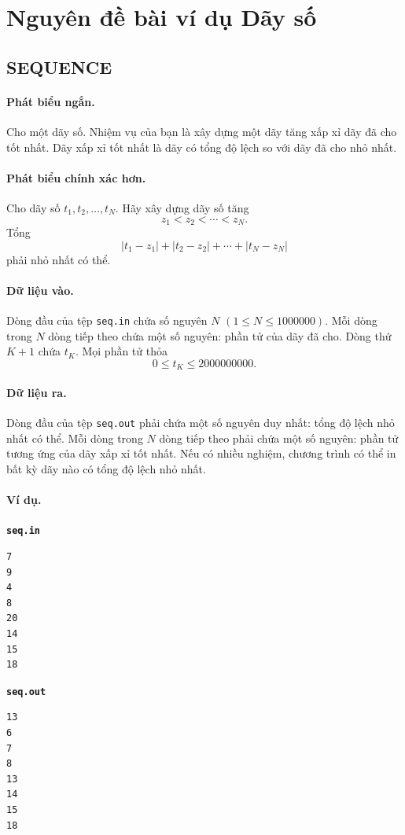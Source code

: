 \documentclass[11pt]{article}
\begin{document}
\appendix
\section{Nguyên đề bài ví dụ Dãy số}

\subsection*{SEQUENCE}

\paragraph{Phát biểu ngắn.}
Cho một dãy số. Nhiệm vụ của bạn là xây dựng một dãy tăng xấp xỉ dãy đã cho tốt
nhất. Dãy xấp xỉ tốt nhất là dãy có tổng độ lệch so với dãy đã cho nhỏ nhất.

\paragraph{Phát biểu chính xác hơn.}
Cho dãy số \(t_1,t_2,\ldots,t_N\). Hãy xây dựng dãy số tăng
\[
  z_1<z_2<\cdots<z_N.
\]
Tổng
\[
  |t_1-z_1|+|t_2-z_2|+\cdots+|t_N-z_N|
\]
phải nhỏ nhất có thể.

\paragraph{Dữ liệu vào.}
Dòng đầu của tệp \texttt{seq.in} chứa số nguyên \(N\)
\((1\le N\le 1000000)\). Mỗi dòng trong \(N\) dòng tiếp theo chứa một số nguyên:
phần tử của dãy đã cho. Dòng thứ \(K+1\) chứa \(t_K\). Mọi phần tử thỏa
\[
  0\le t_K\le 2000000000.
\]

\paragraph{Dữ liệu ra.}
Dòng đầu của tệp \texttt{seq.out} phải chứa một số nguyên duy nhất: tổng độ lệch
nhỏ nhất có thể. Mỗi dòng trong \(N\) dòng tiếp theo phải chứa một số nguyên:
phần tử tương ứng của dãy xấp xỉ tốt nhất. Nếu có nhiều nghiệm, chương trình có
thể in bất kỳ dãy nào có tổng độ lệch nhỏ nhất.

\paragraph{Ví dụ.}
\noindent\begin{minipage}[t]{0.45\linewidth}
\textbf{\texttt{seq.in}}
\begin{verbatim}
7
9
4
8
20
14
15
18
\end{verbatim}
\end{minipage}\hfill
\begin{minipage}[t]{0.45\linewidth}
\textbf{\texttt{seq.out}}
\begin{verbatim}
13
6
7
8
13
14
15
18
\end{verbatim}
\end{minipage}
\end{document}
